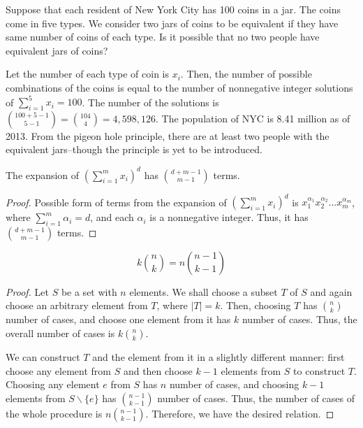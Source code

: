 \documentclass[../main.tex]{subfiles}
\begin{document}
\begin{prob} 
    Suppose that each resident of New York City has 100 coins in a jar.
    The coins come in five types.
    We consider two jars of coins to be equivalent if they have same number of coins of each type.
    Is it possible that no two people have equivalent jars of coins?
\end{prob}
\begin{sol}
    Let the number of each type of coin is $x_i$.
    Then, the number of possible combinations of the coins is equal to the number of nonnegative integer solutions of $\sum_{i=1}^5 x_i = 100$.
    The number of the solutions is ${100 + 5 - 1 \choose 5 - 1} = {104 \choose 4} = 4,598,126$.
    The population of NYC is 8.41 million as of 2013.
    From the pigeon hole principle, there are at least two people with the equivalent jars--though the principle is yet to be introduced.
\end{sol}

\begin{cor}
    The expansion of $\left( \sum_{i=1}^m x_i \right)^d$ has $d + m - 1 \choose m - 1$ terms.
\end{cor}
\begin{proof}
    Possible form of terms from the expansion of $\left( \sum_{i=1}^m x_i \right)^d$ is $x_1^{\alpha_1} x_2^{\alpha_2} \dots x_m^{\alpha_m}$, where $\sum_{i=1}^m \alpha_i = d$, and each $\alpha_i$ is a nonnegative integer.
    Thus, it has $d + m - 1 \choose m - 1$ terms.
\end{proof}

\begin{lem} 
    \[
        k {n \choose k} = n {n - 1 \choose k - 1}
    \]
\end{lem}
\begin{proof}
    Let $S$ be a set with $n$ elements.
    We shall choose a subset $T$ of $S$ and again choose an arbitrary element from $T$, where $|T| = k$.
    Then, choosing $T$ has $n \choose k$ number of cases, and choose one element from it has $k$ number of cases.
    Thus, the overall number of cases is $k {n \choose k}$.

    We can construct $T$ and the element from it in a slightly different manner: first choose any element from $S$ and then choose $k - 1$ elements from $S$ to construct $T$.
    Choosing any element $e$ from $S$ has $n$ number of cases, and choosing $k - 1$ elements from $S \backslash \{e\}$ has $n - 1 \choose k - 1$ number of cases.
    Thus, the number of cases of the whole procedure is $n {n - 1 \choose k - 1}$.
    Therefore, we have the desired relation.
\end{proof}
\end{document}
